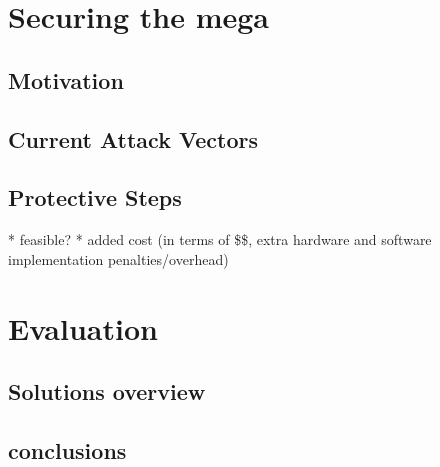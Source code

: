 \documentclass[12pt,a4paper,twocolumn]{article}
\begin{document}
	\section{Securing the mega}
	\subsection{Motivation}
	\subsection{Current Attack Vectors}
	\subsection{Protective Steps}
		* feasible? 
		* added cost (in terms of \$\$, extra hardware and software implementation penalties/overhead)
	
	\section{Evaluation}
	\subsection{Solutions overview}
	\subsection{conclusions}
	
	
		
	
\end{document}
